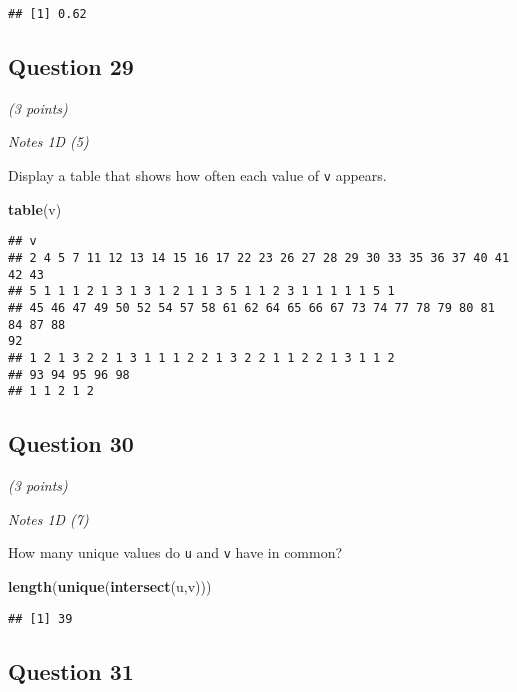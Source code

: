 \documentclass[
]{article}
\newenvironment{Shaded}{\begin{snugshade}}{\end{snugshade}}
\newcommand{\KeywordTok}[1]{\textcolor[rgb]{0.13,0.29,0.53}{\textbf{#1}}}
\newcommand{\NormalTok}[1]{#1}
\begin{document}
\begin{verbatim}
## [1] 0.62
\end{verbatim}

\hypertarget{question-29}{%
\subsection{Question 29}\label{question-29}}

\emph{(3 points)}

\emph{Notes 1D (5)}

Display a table that shows how often each value of \texttt{v} appears.

\begin{Shaded}
\begin{Highlighting}[]
\KeywordTok{table}\NormalTok{(v)}
\end{Highlighting}
\end{Shaded}

\begin{verbatim}
## v
## 2 4 5 7 11 12 13 14 15 16 17 22 23 26 27 28 29 30 33 35 36 37 40 41 42 43
## 5 1 1 1 2 1 3 1 3 1 2 1 1 3 5 1 1 2 3 1 1 1 1 1 5 1
## 45 46 47 49 50 52 54 57 58 61 62 64 65 66 67 73 74 77 78 79 80 81 84 87 88
92
## 1 2 1 3 2 2 1 3 1 1 1 2 2 1 3 2 2 1 1 2 2 1 3 1 1 2
## 93 94 95 96 98
## 1 1 2 1 2
\end{verbatim}

\hypertarget{question-30}{%
\subsection{Question 30}\label{question-30}}

\emph{(3 points)}

\emph{Notes 1D (7)}

How many unique values do \texttt{u} and \texttt{v} have in common?

\begin{Shaded}
\begin{Highlighting}[]
\KeywordTok{length}\NormalTok{(}\KeywordTok{unique}\NormalTok{(}\KeywordTok{intersect}\NormalTok{(u,v)))}
\end{Highlighting}
\end{Shaded}

\begin{verbatim}
## [1] 39
\end{verbatim}

\hypertarget{question-31}{%
\subsection{Question 31}\label{question-31}}
\end{document}
